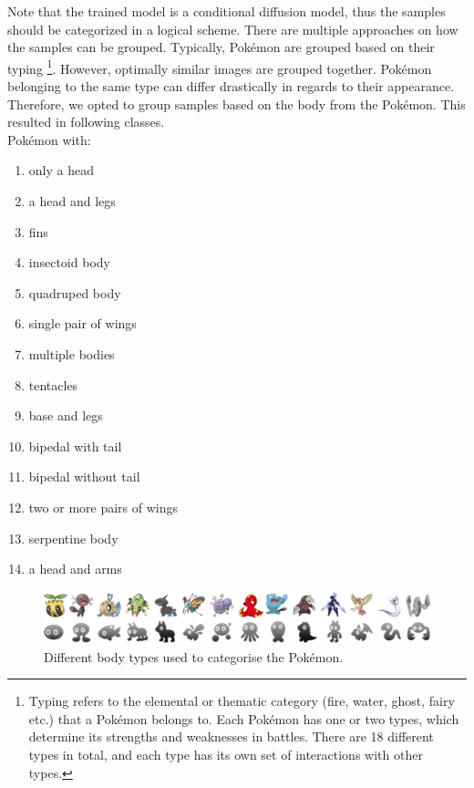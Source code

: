 \documentclass[12pt]{article}
\theoremstyle{plain}
\theoremstyle{definition}
\theoremstyle{remark}
\begin{document}
Note that the trained model is a conditional diffusion model, thus the samples should be categorized in a logical scheme.  There are multiple approaches on how the samples can be grouped. Typically, Pokémon are grouped based on their typing \footnote{Typing refers to the elemental or thematic category (fire, water, ghost, fairy etc.) that a Pokémon belongs to. Each Pokémon has one or two types, which determine its strengths and weaknesses in battles. There are 18 different types in total, and each type has its own set of interactions with other types.}. However, optimally similar images are grouped together. Pokémon belonging to the same type can differ drastically in regards to their appearance. Therefore, we opted to group samples based on the body from the Pokémon. 
This resulted in following classes.\\

Pokémon with: 

\begin{multicols}{3}
	\begin{enumerate}[itemsep=2pt,parsep=2pt]
		\item only a head
		\item a head and legs
		\item fins
		\item insectoid body
		\item quadruped body
		\item single pair of wings
		\item multiple bodies
		\item tentacles
		\item base and legs
		\item bipedal with tail
		\item bipedal without tail
		\item two or more pairs of wings
		\item serpentine body
		\item a head and arms
	\end{enumerate}
\end{multicols}

\begin{figure}[h]
	\centering
	\includegraphics[width=\linewidth]{src/Images/bodyCategorys}
	\caption[Body Categories]{Different body types used to categorise the Pokémon.}
	\label{fig:bodycategorys}
\end{figure}
\end{document}
